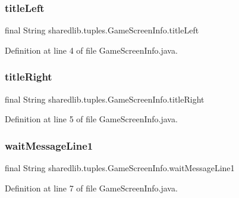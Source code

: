 \subsubsection{\texorpdfstring{title\+Left}{titleLeft}}
{\footnotesize\ttfamily final String sharedlib.\+tuples.\+Game\+Screen\+Info.\+title\+Left}



Definition at line 4 of file Game\+Screen\+Info.\+java.

\hypertarget{classsharedlib_1_1tuples_1_1_game_screen_info_ad7f7ecc83677d2a067d02f746dcd78b9}{}\label{classsharedlib_1_1tuples_1_1_game_screen_info_ad7f7ecc83677d2a067d02f746dcd78b9} 
\subsubsection{\texorpdfstring{title\+Right}{titleRight}}
{\footnotesize\ttfamily final String sharedlib.\+tuples.\+Game\+Screen\+Info.\+title\+Right}



Definition at line 5 of file Game\+Screen\+Info.\+java.

\hypertarget{classsharedlib_1_1tuples_1_1_game_screen_info_aa942419eb30486ee131a58a0077f7e9a}{}\label{classsharedlib_1_1tuples_1_1_game_screen_info_aa942419eb30486ee131a58a0077f7e9a} 
\subsubsection{\texorpdfstring{wait\+Message\+Line1}{waitMessageLine1}}
{\footnotesize\ttfamily final String sharedlib.\+tuples.\+Game\+Screen\+Info.\+wait\+Message\+Line1}



Definition at line 7 of file Game\+Screen\+Info.\+java.

\hypertarget{classsharedlib_1_1tuples_1_1_game_screen_info_ae38bc6bfe2713b88a9b9fd1e1480d9a6}{}\label{classsharedlib_1_1tuples_1_1_game_screen_info_ae38bc6bfe2713b88a9b9fd1e1480d9a6} 
